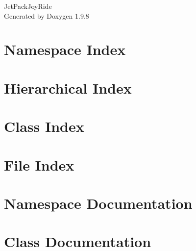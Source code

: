 \documentclass[twoside]{book}
\newcommand{\+}{\discretionary{\mbox{\scriptsize$\hookleftarrow$}}{}{}}
\newcommand{\clearemptydoublepage}{%
    \newpage{\pagestyle{empty}\cleardoublepage}%
  }
\begin{document}
  \raggedbottom
    \hypersetup{pageanchor=false,
                bookmarksnumbered=true,
                pdfencoding=unicode
               }
  \begin{titlepage}
  \vspace*{7cm}
  \begin{center}%
  {\Large Jet\+Pack\+Joy\+Ride}\\
  \vspace*{1cm}
  {\large Generated by Doxygen 1.9.8}\\
  \end{center}
  \end{titlepage}
  \clearemptydoublepage
  \tableofcontents
  \clearemptydoublepage
  \hypersetup{pageanchor=true}

\chapter{Namespace Index}

\chapter{Hierarchical Index}

\chapter{Class Index}

\chapter{File Index}

\chapter{Namespace Documentation}

\chapter{Class Documentation}




































\end{document}

